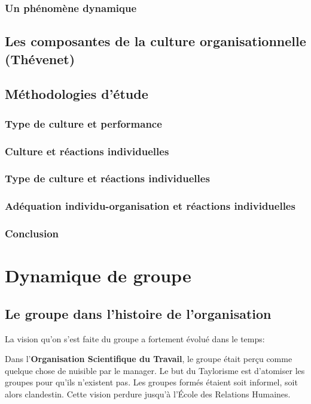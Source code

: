 \documentclass[12pt]{article}
\begin{document}
		\subsubsection{Un phénomène dynamique}
	\subsection{Les composantes de la culture organisationnelle (Thévenet)}
	\subsection{Méthodologies d'étude}
		\subsubsection{Type de culture et performance}
		\subsubsection{Culture et réactions individuelles}
		\subsubsection{Type de culture et réactions individuelles}
		\subsubsection{Adéquation individu-organisation et réactions individuelles}
		\subsubsection{Conclusion}
		
\section{Dynamique de groupe}
	\subsection{Le groupe dans l’histoire de l’organisation}
	
	La vision qu'on s'est faite du groupe a fortement évolué dans le temps: \newline
	
	Dans l'\textbf{Organisation Scientifique du Travail}, le groupe était perçu comme quelque chose de nuisible par le manager. Le but du Taylorisme est d'atomiser les groupes pour qu'ils n'existent pas. Les groupes formés étaient soit informel, soit alors clandestin. Cette vision perdure jusqu'à l'École des Relations Humaines.\newline
	
\end{document}

